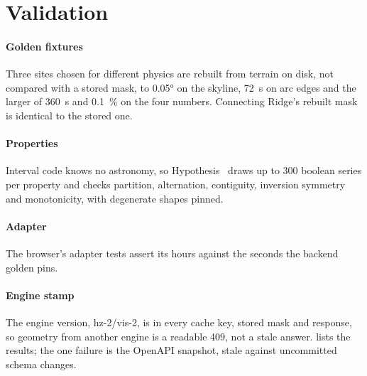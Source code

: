 \documentclass[conference]{IEEEtran}
\begin{document}
\section{Validation}

\paragraph{Golden fixtures} Three sites chosen for different physics are rebuilt
from terrain on disk, not compared with a stored mask, to \ang{0.05}
on the skyline, \qty{72}{\second} on arc edges and the larger of
\qty{360}{\second} and \qty{0.1}{\percent} on the four numbers. Connecting
Ridge's rebuilt mask is identical to the stored one.

\paragraph{Properties} Interval code knows no astronomy, so
Hypothesis~\cite{maciver2019hypothesis} draws up to \num{300} boolean series per
property and checks partition, alternation, contiguity, inversion symmetry and
monotonicity, with degenerate shapes pinned.

\paragraph{Adapter} The browser's adapter tests assert its hours against the
seconds the backend golden pins.

\paragraph{Engine stamp} The engine version, hz-2/vis-2, is in every cache key,
stored mask and response, so geometry from another engine is a readable 409,
not a stale answer.  lists the results; the one failure is the
OpenAPI snapshot, stale against uncommitted schema changes.
\end{document}

